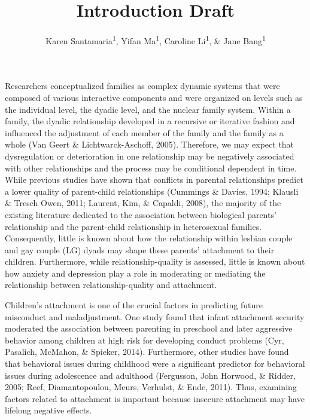 \documentclass[man]{apa6}
\title{Introduction Draft}
\author{Karen Santamaria\textsuperscript{1}, Yifan Ma\textsuperscript{1}, Caroline Li\textsuperscript{1}, \& Jane Bang\textsuperscript{1}}
\date{}
\affiliation{
\vspace{0.5cm}
\textsuperscript{1} Smith College}
\begin{document}
\maketitle

Researchers conceptualized families as complex dynamic systems that were composed of various interactive components and were organized on levels such as the individual level, the dyadic level, and the nuclear family system. Within a family, the dyadic relationship developed in a recursive or iterative fashion and influenced the adjustment of each member of the family and the family as a whole (Van Geert \& Lichtwarck-Aschoff, 2005). Therefore, we may expect that dysregulation or deterioration in one relationship may be negatively associated with other relationships and the process may be conditional dependent in time. While previous studies have shown that conflicts in parental relationships predict a lower quality of parent-child relationships (Cummings \& Davies, 1994; Klausli \& Tresch Owen, 2011; Laurent, Kim, \& Capaldi, 2008), the majority of the existing literature dedicated to the association between biological parents' relationship and the parent-child relationship in heterosexual families. Consequently, little is known about how the relationship within lesbian couple and gay couple (LG) dyads may shape these parents' attachment to their children. Furthermore, while relationship-quality is assessed, little is known about how anxiety and depression play a role in moderating or mediating the relationship between relationship-quality and attachment.

Children's attachment is one of the crucial factors in predicting future misconduct and maladjustment. One study found that infant attachment security moderated the association between parenting in preschool and later aggressive behavior among children at high risk for developing conduct problems (Cyr, Pasalich, McMahon, \& Spieker, 2014). Furthermore, other studies have found that behavioral issues during childhood were a significant predictor for behavioral issues during adolescence and adulthood (Fergusson, John Horwood, \& Ridder, 2005; Reef, Diamantopoulou, Meurs, Verhulst, \& Ende, 2011). Thus, examining factors related to attachment is important because insecure attachment may have lifelong negative effects.
\end{document}

